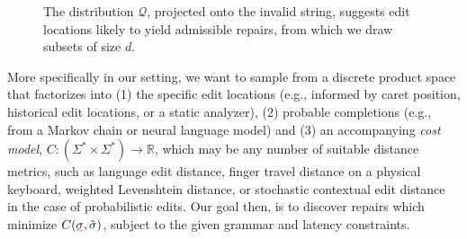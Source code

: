 \documentclass[sigplan,review,anonymous,acmsmall]{acmart}\settopmatter{printfolios=false,printccs=false,printacmref=false}
\begin{document}
\begin{figure}
  \caption{The distribution $\mathcal{Q}$, projected onto the invalid string, suggests edit locations likely to yield admissible repairs, from which we draw subsets of size $d$.}\label{fig:prob_reach}
\end{figure}

More specifically in our setting, we want to sample from a discrete product space that factorizes into (1) the specific edit locations (e.g., informed by caret position, historical edit locations, or a static analyzer), (2) probable completions (e.g., from a Markov chain or neural language model) and (3) an accompanying \textit{cost model}, $C: (\Sigma^* \times \Sigma^*) \rightarrow \mathbb{R}$, which may be any number of suitable distance metrics, such as language edit distance, finger travel distance on a physical keyboard, weighted Levenshtein distance, or stochastic contextual edit distance~\cite{cotterell+al.acl14} in the case of probabilistic edits. Our goal then, is to discover repairs which minimize $C(\err{\sigma}, \tilde{\sigma})$, subject to the given grammar and latency constraints.
\end{document}

